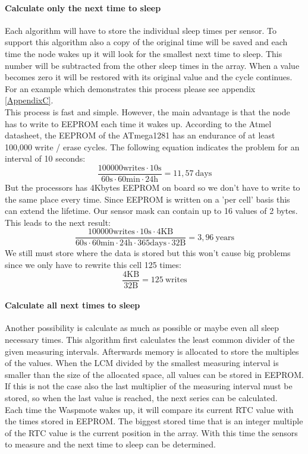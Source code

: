 \paragraph{Calculate only the next time to sleep}
Each algorithm will have to store the individual sleep times per sensor. To support this algorithm also a copy of the original time will be saved and each time the node wakes up it will look for the smallest next time to sleep. This number will be subtracted from the other sleep times in the array. When a value becomes zero it will be restored with its original value and the cycle continues.  For an example which demonstrates this process please see appendix \ref{AppendixC}.\\
This process is fast and simple. However, the main advantage is that the node has to write to EEPROM each time it wakes up. According to the Atmel datasheet, the EEPROM of the ATmega1281 has an endurance of at least 100,000 write / erase cycles. The following equation indicates the problem for an interval of 10 seconds:
\begin{equation}
\frac{100000 \mathrm{writes} \cdot 10 \mathrm{s}}{60 \mathrm{s} \cdot 60 \mathrm{min} \cdot 24 \mathrm{h}}= 11,57 \: \mathrm{days} 
\label{eq:1}
\end{equation}
But the processors has 4Kbytes EEPROM on board so we don't have to write to the same place every time. Since EEPROM is written on a 'per cell' basis this can extend the lifetime. Our sensor mask can contain up to 16 values of 2 bytes. This leads to the next result:
\begin{equation}
\frac{100000 \mathrm{writes} \cdot 10 \mathrm{s} \cdot 4\mathrm{KB}}{60 \mathrm{s} \cdot 60 \mathrm{min} \cdot 24 \mathrm{h} \cdot 365\mathrm{days} \cdot 32\mathrm{B}} = 3,96\: \mathrm{years}
\end{equation}
We still must store where the data is stored but this won't cause big problems since we only have to rewrite this cell 125 times:
\begin{equation}
\frac{4\mathrm{KB}}{32\mathrm{B}} = 125 \: \mathrm{writes}
\end{equation}
\paragraph{Calculate all next times to sleep}
Another possibility is calculate as much as possible or maybe even all sleep necessary times. This algorithm first calculates the least common divider of the given measuring intervals. Afterwards memory is allocated to store the multiples of the values. When the LCM divided by the smallest measuring interval is smaller than the size of the allocated space, all values can be stored in EEPROM. If this is not the case also the last multiplier of the measuring interval must be stored, so when the last value is reached, the next series can be calculated.\\
Each time the Waspmote wakes up, it will compare its current RTC value with the times stored in EEPROM. The biggest stored time that is an integer multiple of the RTC value is the current position in the array. With this time the sensors to measure and the next time to sleep can be determined.
